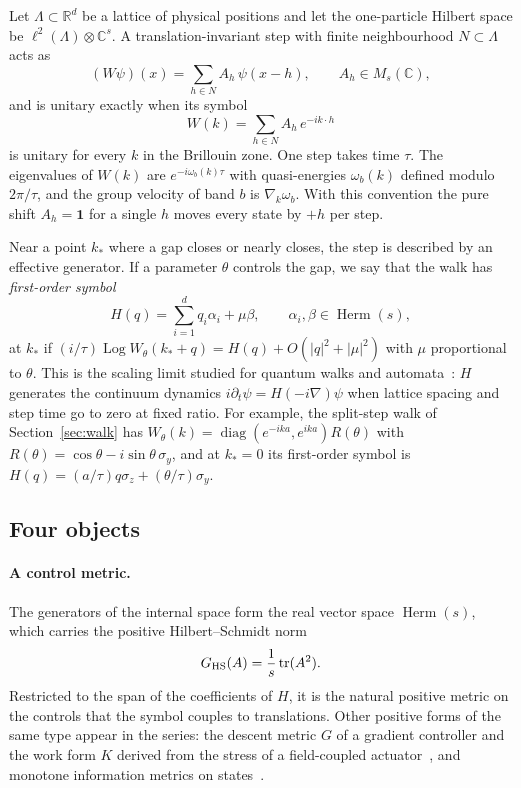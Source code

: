 \documentclass[12pt]{article}
\theoremstyle{definition}
\theoremstyle{remark}
\newcommand{\tr}{\operatorname{tr}}
\newcommand{\Herm}{\operatorname{Herm}}
\begin{document}
Let $\Lambda\subset\mathbb R^d$ be a lattice of physical positions and let the one-particle Hilbert space be $\ell^2(\Lambda)\otimes\mathbb C^s$. A translation-invariant step with finite neighbourhood $N\subset\Lambda$ acts as
\begin{equation}
(W\psi)(x)=\sum_{h\in N}A_h\,\psi(x-h),\qquad A_h\in M_s(\mathbb C),
\label{eq:step}
\end{equation}
and is unitary exactly when its symbol
\begin{equation}
W(k)=\sum_{h\in N}A_h\,e^{-ik\cdot h}
\label{eq:symbol}
\end{equation}
is unitary for every $k$ in the Brillouin zone. One step takes time $\tau$. The eigenvalues of $W(k)$ are $e^{-i\omega_b(k)\tau}$ with quasi-energies $\omega_b(k)$ defined modulo $2\pi/\tau$, and the group velocity of band $b$ is $\nabla_k\omega_b$. With this convention the pure shift $A_{h}=\mathbf 1$ for a single $h$ moves every state by $+h$ per step.

Near a point $k_*$ where a gap closes or nearly closes, the step is described by an effective generator. If a parameter $\theta$ controls the gap, we say that the walk has \emph{first-order symbol}
\begin{equation}
H(q)=\sum_{i=1}^d q_i\alpha_i+\mu\beta,\qquad \alpha_i,\beta\in\Herm(s),
\label{eq:firstorder}
\end{equation}
at $k_*$ if $(i/\tau)\operatorname{Log}W_\theta(k_*+q)=H(q)+O(|q|^2+|\mu|^2)$ with $\mu$ proportional to $\theta$. This is the scaling limit studied for quantum walks and automata~\cite{Strauch2006,BisioDArianoTosini2015,DArianoPerinotti2014}: $H$ generates the continuum dynamics $i\partial_t\psi=H(-i\nabla)\psi$ when lattice spacing and step time go to zero at fixed ratio. For example, the split-step walk of Section~\ref{sec:walk} has $W_\theta(k)=\operatorname{diag}(e^{-ika},e^{ika})R(\theta)$ with $R(\theta)=\cos\theta-i\sin\theta\,\sigma_y$, and at $k_*=0$ its first-order symbol is $H(q)=(a/\tau)q\sigma_z+(\theta/\tau)\sigma_y$.

\subsection{Four objects}
\label{sec:objects}

\paragraph{A control metric.} The generators of the internal space form the real vector space $\Herm(s)$, which carries the positive Hilbert--Schmidt norm
\begin{equation}
G_{\rm HS}(A)=\frac1s\tr(A^2).
\label{eq:HS}
\end{equation}
Restricted to the span of the coefficients of $H$, it is the natural positive metric on the controls that the symbol couples to translations. Other positive forms of the same type appear in the series: the descent metric $G$ of a gradient controller and the work form $K$ derived from the stress of a field-coupled actuator~\cite{Liu2026QRAIF_B}, and monotone information metrics on states~\cite{Petz1996}.
\end{document}

